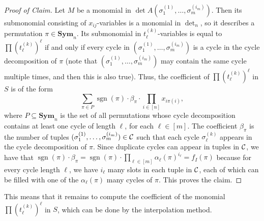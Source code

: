\documentclass[11pt, DIV=15]{scrarticle}
\theoremstyle{definition}
\theoremstyle{plain}
\theoremstyle{remark}
\newenvironment{claimproof}[1][Proof of Claim]{\begin{proof}[#1] \renewcommand{\qedsymbol}{$\lrcorner$}}{ \end{proof}}
\newcommand{\Cc}{{\cal C}}
\newcommand{\Sym}{\mathbf{Sym}}
\DeclareMathOperator{\sgn}{sgn}
\begin{document}
\begin{claimproof} Let $M$ be a monomial in $\det A(\sigma_1^{(1)},\dots ,\sigma_{m}^{(i_m)})$. Then its submonomial consisting of $x_{ij}$-variables is a monomial in $\det_n$, so it describes a permutation $\pi \in \Sym_n$. Its submonomial in $t_\ell^{(k)}$-variables is equal to $\prod (t_\ell^{(k)})^\ell$ if and only if every cycle in $(\sigma_1^{(1)},\dots ,\sigma_{m}^{(i_m)})$ is a cycle in the cycle decomposition of $\pi$ (note that $(\sigma_1^{(1)},\dots ,\sigma_{m}^{(i_m)})$ may contain the same cycle multiple times, and then this is also true). 
Thus, the coefficient of $\prod (t_\ell^{(k)})^\ell$ in $S$ is of the form
\[
\sum_{\pi \in P}  \sgn(\pi) \cdot \beta_{\pi} \cdot \prod_{i \in [n]} x_{i\pi(i)},  
\]
where $P \subseteq \Sym_n$ is the set of all permutations whose cycle decomposition contains at least one cycle of length $\ell$, for each $\ell \in [m]$. The coefficient $\beta_\pi$ is the number of tuples 
$(\sigma_1^{(1)},\dots ,\sigma_{m}^{(i_m)}) \in \Cc$ such that each cycle $\sigma_\ell^{(k)}$ appears in the cycle decomposition of $\pi$. Since duplicate cycles can appear in tuples in $\Cc$, we have that $\sgn(\pi) \cdot \beta_\pi = \sgn(\pi) \cdot \prod_{\ell \in [m]} \alpha_\ell(\pi)^{i_\ell} = f_I(\pi)$ because for every cycle length $\ell$, we have $i_\ell$ many slots in each tuple in $\Cc$, each of which can be filled with one of the $\alpha_\ell(\pi)$ many cycles of $\pi$. This proves the claim.
\end{claimproof}

This means that it remains to compute the coefficient of the monomial $\prod (t_\ell^{(k)})^\ell$ in $S$, which can be done by the interpolation method.\\
\end{document}
